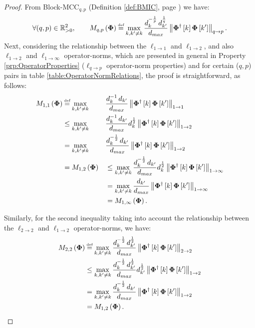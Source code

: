 \begin{proof}
From Block-MCC$_{q,p}$ (Definition \ref{def:BMIC}, page \pageref{def:BMIC}) we have:
\begin{equation*}
\begin{aligned}
\forall (q , p) \in \mathbb{R}^2_{>0}, \qquad
M_{q,p}\myparanthese{\myPhi} 
\myeq \max_{k,k' \neq k} \frac{d_{k}^{-\frac1p} \, d_{k'}^{\frac1q}}{d_{max}} \mynorm{\myPhi^\dagger\mybracket{k} \myPhi \mybracket{k'}}_{q \to p}.
\end{aligned}
\end{equation*}
Next, considering the relationship between the $\ell_{1 \to 1}$ and $\ell_{1 \to 2}$, and also $\ell_{1 \to 2}$ and $\ell_{1 \to \infty}$ operator-norms, which are presented in general in Property \ref{prp:OperatorProperties} ($\ell_{q {\to} p}$ operator-norm properties) and for certain ($q,p$) pairs in table \ref{table:OperatorNormRelations}, the proof is straightforward, as follows:
\begin{equation*}
\begin{aligned}
M_{1,1}\myparanthese{\myPhi} 
&\myeq \max_{k,k' \neq k} &&\frac{d_{k}^{-1} \, d_{k'}}{d_{max}} \mynorm{\myPhi^\dagger\mybracket{k} \myPhi \mybracket{k'}}_{1 \to 1} \\
&\leq \max_{k,k' \neq k} &&\frac{d_{k}^{-1} \, d_{k'}}{d_{max}} d_{k}^{\frac12} \mynorm{\myPhi^\dagger\mybracket{k} \myPhi \mybracket{k'}}_{1 \to 2} \\
&= \max_{k,k' \neq k} &&\frac{d_{k}^{-\frac12} \, d_{k'}}{d_{max}} \mynorm{\myPhi^\dagger\mybracket{k} \myPhi \mybracket{k'}}_{1 \to 2} \\
&= M_{1,2}\myparanthese{\myPhi} 
&&\leq \max_{k,k' \neq k} \frac{d_{k}^{-\frac12} \, d_{k'}}{d_{max}} d_{k}^{\frac12} \mynorm{\myPhi^\dagger\mybracket{k} \myPhi \mybracket{k'}}_{1 \to \infty} \\
& &&= \max_{k,k' \neq k} \frac{d_{k'}}{d_{max}} \mynorm{\myPhi^\dagger\mybracket{k} \myPhi \mybracket{k'}}_{1 \to \infty} \\
& &&= M_{1,\infty}\myparanthese{\myPhi}.
\end{aligned}
\end{equation*}

Similarly, for the second inequality taking into account the relationship between the $\ell_{2 \to 2}$ and $\ell_{1 \to 2}$ operator-norms, we have:
\begin{equation*}
\begin{aligned}
M_{2,2}\myparanthese{\myPhi} 
&\myeq \max_{k,k' \neq k} \frac{d_{k}^{-\frac12} \, d_{k'}^{\frac12}}{d_{max}} \mynorm{\myPhi^\dagger\mybracket{k} \myPhi \mybracket{k'}}_{2 \to 2} \\
&\leq \max_{k,k' \neq k} \frac{d_{k}^{-\frac12} \, d_{k'}^{\frac12}}{d_{max}} d_{k'}^{\frac12} \mynorm{\myPhi^\dagger\mybracket{k} \myPhi \mybracket{k'}}_{1 \to 2} \\
&= \max_{k,k' \neq k} \frac{d_{k}^{-\frac12} \, d_{k'}}{d_{max}} \mynorm{\myPhi^\dagger\mybracket{k} \myPhi \mybracket{k'}}_{1 \to 2} \\
&= M_{1,2}\myparanthese{\myPhi}.
\end{aligned}
\end{equation*}


\end{proof}
